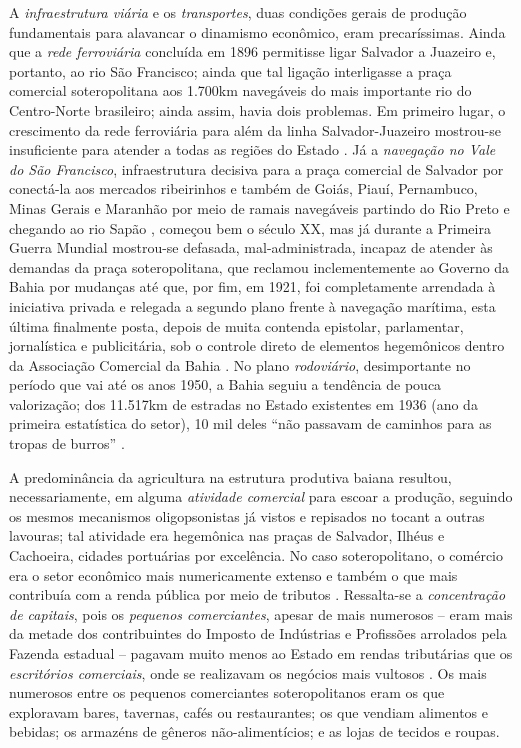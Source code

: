A \textit{infraestrutura viária} e os \textit{transportes}, duas condições gerais de produção fundamentais para alavancar o dinamismo econômico, eram precaríssimas. Ainda que a \textit{rede ferroviária} concluída em 1896 permitisse ligar Salvador a Juazeiro e, portanto, ao rio São Francisco; ainda que tal ligação interligasse a praça comercial soteropolitana aos 1.700km navegáveis do mais importante rio do Centro-Norte brasileiro; ainda assim, havia dois problemas. Em primeiro lugar, o crescimento da rede ferroviária para além da linha Salvador-Juazeiro mostrou-se insuficiente para atender a todas as regiões do Estado \cite[p.~31]{CPE1980}. Já a \textit{navegação no Vale do São Francisco}, infraestrutura decisiva para a praça comercial de Salvador por conectá-la aos mercados ribeirinhos e também de Goiás, Piauí, Pernambuco, Minas Gerais e Maranhão por meio de ramais navegáveis partindo do Rio Preto e chegando ao rio Sapão \cite[p.~220]{CUNHA2011}, começou bem o século XX, mas já durante a Primeira Guerra Mundial mostrou-se defasada, mal-administrada, incapaz de atender às demandas da praça soteropolitana, que reclamou inclementemente ao Governo da Bahia por mudanças até que, por fim, em 1921, foi completamente arrendada à iniciativa privada e relegada a segundo plano frente à navegação marítima, esta última finalmente posta, depois de muita contenda epistolar, parlamentar, jornalística e publicitária, sob o controle direto de elementos hegemônicos dentro da Associação Comercial da Bahia \cite[p.~221-223]{CUNHA2011}. No plano \textit{rodoviário}, desimportante no período que vai até os anos 1950, a Bahia seguiu a tendência de pouca valorização; dos 11.517km de estradas no Estado existentes em 1936 (ano da primeira estatística do setor), 10 mil deles ``não passavam de caminhos para as tropas de burros'' \cite[p.~31]{CPE1980}.

A predominância da agricultura na estrutura produtiva baiana resultou, necessariamente, em alguma \textit{atividade comercial} para escoar a produção, seguindo os mesmos mecanismos oligopsonistas já vistos e repisados no tocant a outras lavouras; tal atividade era hegemônica nas praças de Salvador, Ilhéus e Cachoeira, cidades portuárias por excelência. No caso soteropolitano, o comércio era o setor econômico mais numericamente extenso e também o que mais contribuía com a renda pública por meio de tributos \cite[p.~55]{CPE1980}. Ressalta-se a \textit{concentração de capitais}, pois os \textit{pequenos comerciantes}, apesar de mais numerosos -- eram mais da metade dos contribuintes do Imposto de Indústrias e Profissões arrolados pela Fazenda estadual -- pagavam muito menos ao Estado em rendas tributárias que os \textit{escritórios comerciais}, onde se realizavam os negócios mais vultosos \cite[p.~56]{CPE1980}. Os mais numerosos entre os pequenos comerciantes soteropolitanos eram os que exploravam bares, tavernas, cafés ou restaurantes; os que vendiam alimentos e bebidas; os armazéns de gêneros não-alimentícios; e as lojas de tecidos e roupas. 

